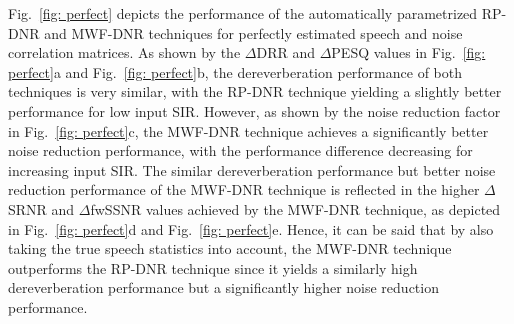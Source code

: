 \documentclass[draftcls,onecolumn,11pt]{IEEEtran}
\begin{document}
Fig.~\ref{fig: perfect} depicts the performance of the automatically parametrized RP-DNR and MWF-DNR techniques for perfectly estimated speech and noise correlation matrices.
As shown by the $\Delta$DRR and $\Delta$PESQ values in Fig.~\ref{fig: perfect}a and Fig.~\ref{fig: perfect}b, the dereverberation performance of both techniques is very similar, with the RP-DNR technique yielding a slightly better performance for low input SIR.
However, as shown by the noise reduction factor in Fig.~\ref{fig: perfect}c, the MWF-DNR technique achieves a significantly better noise reduction performance, with the performance difference decreasing for increasing input SIR. 
The similar dereverberation performance but better noise reduction performance of the MWF-DNR technique is reflected in the higher $\Delta$SRNR and $\Delta$fwSSNR values achieved by the MWF-DNR technique, as depicted in Fig.~\ref{fig: perfect}d and Fig.~\ref{fig: perfect}e.
Hence, it can be said that by also taking the true speech statistics into account, the MWF-DNR technique outperforms the RP-DNR technique since it yields a similarly high dereverberation performance but a significantly higher noise reduction performance. 
\end{document}

